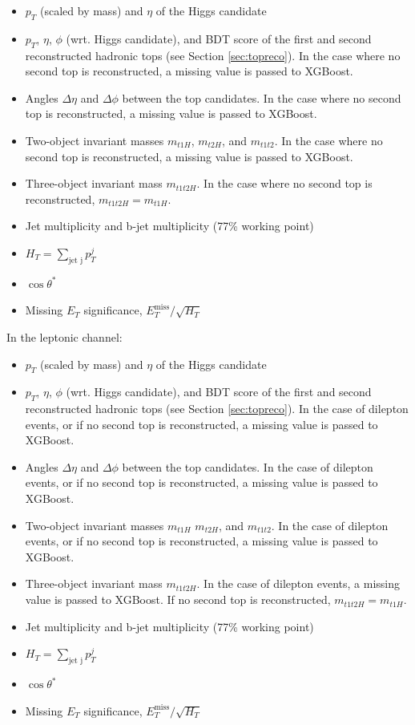 \begin{itemize}
\item $p_{T}$ (scaled by mass) and $\eta$ of the Higgs candidate
\item $p_{T}$, $\eta$, $\phi$ (wrt. Higgs candidate), and BDT score of the first and second reconstructed hadronic tops (see Section \ref{sec:topreco}). In the case where no second top is reconstructed, a missing value is passed to XGBoost.
\item Angles $\Delta\eta$ and $\Delta\phi$ between the top candidates. In the case where no second top is reconstructed, a missing value is passed to XGBoost.
\item Two-object invariant masses $m_{t1H}$, $m_{t2H}$, and $m_{t1t2}$. In the case where no second top is reconstructed, a missing value is passed to XGBoost.
\item Three-object invariant mass $m_{t1t2H}$. In the case where no second top is reconstructed, $m_{t1t2H} = m_{t1H}$.
\item Jet multiplicity and b-jet multiplicity (77\% working point)
\item $H_{T} = \sum_\text{jet j} p^{j}_{T}$
\item $\cos\theta^{*}$
\item Missing $E_{T}$ significance, $E_{T}^\text{miss}/\sqrt{H_{T}}$
\end{itemize}

In the leptonic channel: 

\begin{itemize} 
\item $p_{T}$ (scaled by mass) and $\eta$ of the Higgs candidate
\item $p_{T}$, $\eta$, $\phi$ (wrt. Higgs candidate), and BDT score of the first and second reconstructed hadronic tops (see Section \ref{sec:topreco}). In the case of dilepton events, or if no second top is reconstructed, a missing value is passed to XGBoost.
\item Angles $\Delta\eta$ and $\Delta\phi$ between the top candidates. In the case of dilepton events, or if no second top is reconstructed, a missing value is passed to XGBoost.
\item Two-object invariant masses $m_{t1H}$ $m_{t2H}$, and $m_{t1t2}$. In the case of dilepton events, or if no second top is reconstructed, a missing value is passed to XGBoost.
\item Three-object invariant mass $m_{t1t2H}$. In the case of dilepton events, a missing value is passed to XGBoost. If no second top is reconstructed, $m_{t1t2H} = m_{t1H}$.
\item Jet multiplicity and b-jet multiplicity (77\% working point)
\item $H_{T} = \sum_\text{jet j} p^{j}_{T}$
\item $\cos\theta^{*}$
\item Missing $E_{T}$ significance, $E_{T}^\text{miss}/\sqrt{H_{T}}$
\end{itemize} 

